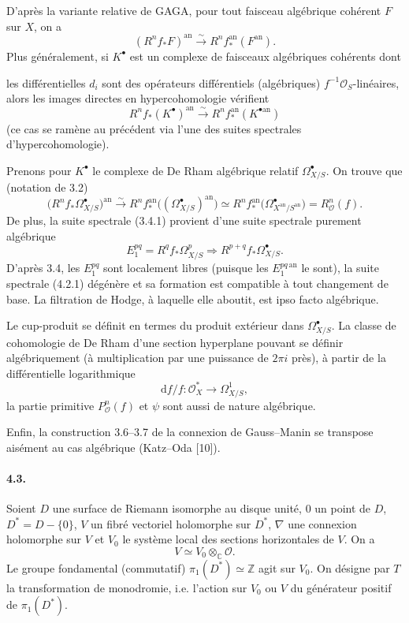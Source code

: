 \documentclass[10pt]{article}
\newcommand{\C}{\mathbb C}
\newcommand{\Z}{\mathbb Z}
\newcommand{\cO}{\mathcal O}
\theoremstyle{deligne}
\newcommand{\dd}{\mathrm d}
\begin{document}
D'après la variante relative de GAGA, pour tout faisceau algébrique cohérent $F$ sur $X$, on a
\[
(R^nf_*F)^{\mathrm{an}}\xrightarrow{\sim}R^nf_*^{\mathrm{an}}(F^{\mathrm{an}}).
\]
Plus généralement, si $K^\bullet$ est un complexe de faisceaux algébriques cohérents dont


les différentielles $d_i$ sont des opérateurs différentiels (algébriques) $f^{-1}\cO_S$-linéaires, alors les images directes en hypercohomologie vérifient
\[
  R^n f_*(K^\bullet)^{\mathrm{an}}
  \xrightarrow{\sim}
  R^n f_*^{\mathrm{an}}(K^{\bullet\mathrm{an}})
\]
(ce cas se ramène au précédent via l'une des suites spectrales d'hypercohomologie).

Prenons pour $K^\bullet$ le complexe de De Rham algébrique relatif $\Omega^\bullet_{X/S}$. On trouve que (notation de 3.2)
\[
\bigl(R^n f_*\Omega^\bullet_{X/S}\bigr)^{\mathrm{an}}
 \xrightarrow{\sim}
 R^n f_*^{\mathrm{an}}\bigl((\Omega^\bullet_{X/S})^{\mathrm{an}}\bigr)
 \simeq
 R^n f_*^{\mathrm{an}}\bigl(\Omega^\bullet_{X^{\mathrm{an}}/S^{\mathrm{an}}}\bigr)
 =
 R^n_{\cO}(f).
\]
De plus, la suite spectrale (3.4.1) provient d'une suite spectrale purement algébrique
\[
\tag{4.2.1}
E_1^{pq}=R^q f_*\Omega^p_{X/S}
\Longrightarrow
R^{p+q}f_*\Omega^\bullet_{X/S}.
\]
D'après 3.4, les $E_1^{pq}$ sont localement libres (puisque les $E_1^{pq\,\mathrm{an}}$ le sont), la suite spectrale (4.2.1) dégénère et sa formation est compatible à tout changement de base. La filtration de Hodge, à laquelle elle aboutit, est ipso facto algébrique.

Le cup-produit se définit en termes du produit extérieur dans $\Omega^\bullet_{X/S}$. La classe de cohomologie de De Rham d'une section hyperplane pouvant se définir algébriquement (à multiplication par une puissance de $2\pi i$ près), à partir de la différentielle logarithmique
\[
  \dd f/f:\cO_X^*\longrightarrow \Omega^1_{X/S},
\]
la partie primitive $P^n_{\cO}(f)$ et $\psi$ sont aussi de nature algébrique.

Enfin, la construction 3.6--3.7 de la connexion de Gauss--Manin se transpose aisément au cas algébrique (Katz--Oda [10]).

\paragraph{4.3.}
Soient $D$ une surface de Riemann isomorphe au disque unité, $0$ un point de $D$, $D^*=D-\{0\}$, $V$ un fibré vectoriel holomorphe sur $D^*$, $\nabla$ une connexion holomorphe sur $V$ et $V_0$ le système local des sections horizontales de $V$. On a
\[
  V \simeq V_0\otimes_\C \cO .
\]
Le groupe fondamental (commutatif) $\pi_1(D^*)\simeq \Z$ agit sur $V_0$. On désigne par $T$ la transformation de monodromie, i.e. l'action sur $V_0$ ou $V$ du générateur positif de $\pi_1(D^*)$.
\end{document}
